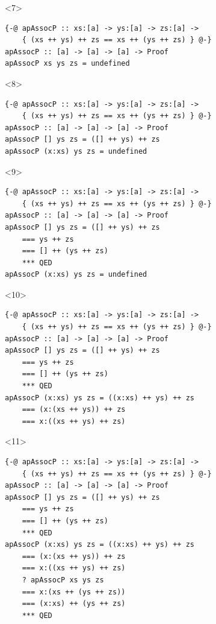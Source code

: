 \documentclass{beamer}
\begin{document}
\begin{frame}[fragile]
\begin{onlyenv}<7>
\begin{verbatim}
{-@ apAssocP :: xs:[a] -> ys:[a] -> zs:[a] ->
    { (xs ++ ys) ++ zs == xs ++ (ys ++ zs) } @-}
apAssocP :: [a] -> [a] -> [a] -> Proof
apAssocP xs ys zs = undefined
\end{verbatim}
\end{onlyenv}

\begin{onlyenv}<8>
\begin{verbatim}
{-@ apAssocP :: xs:[a] -> ys:[a] -> zs:[a] ->
    { (xs ++ ys) ++ zs == xs ++ (ys ++ zs) } @-}
apAssocP :: [a] -> [a] -> [a] -> Proof
apAssocP [] ys zs = ([] ++ ys) ++ zs
apAssocP (x:xs) ys zs = undefined
\end{verbatim}
\end{onlyenv}

\begin{onlyenv}<9>
\begin{verbatim}
{-@ apAssocP :: xs:[a] -> ys:[a] -> zs:[a] ->
    { (xs ++ ys) ++ zs == xs ++ (ys ++ zs) } @-}
apAssocP :: [a] -> [a] -> [a] -> Proof
apAssocP [] ys zs = ([] ++ ys) ++ zs
    === ys ++ zs
    === [] ++ (ys ++ zs)
    *** QED
apAssocP (x:xs) ys zs = undefined
\end{verbatim}
\end{onlyenv}

\begin{onlyenv}<10>
\begin{verbatim}
{-@ apAssocP :: xs:[a] -> ys:[a] -> zs:[a] ->
    { (xs ++ ys) ++ zs == xs ++ (ys ++ zs) } @-}
apAssocP :: [a] -> [a] -> [a] -> Proof
apAssocP [] ys zs = ([] ++ ys) ++ zs
    === ys ++ zs
    === [] ++ (ys ++ zs)
    *** QED
apAssocP (x:xs) ys zs = ((x:xs) ++ ys) ++ zs
    === (x:(xs ++ ys)) ++ zs
    === x:((xs ++ ys) ++ zs)
\end{verbatim}
\end{onlyenv}

\begin{onlyenv}<11>
\begin{verbatim}
{-@ apAssocP :: xs:[a] -> ys:[a] -> zs:[a] ->
    { (xs ++ ys) ++ zs == xs ++ (ys ++ zs) } @-}
apAssocP :: [a] -> [a] -> [a] -> Proof
apAssocP [] ys zs = ([] ++ ys) ++ zs
    === ys ++ zs
    === [] ++ (ys ++ zs)
    *** QED
apAssocP (x:xs) ys zs = ((x:xs) ++ ys) ++ zs
    === (x:(xs ++ ys)) ++ zs
    === x:((xs ++ ys) ++ zs)
    ? apAssocP xs ys zs
    === x:(xs ++ (ys ++ zs))
    === (x:xs) ++ (ys ++ zs)
    *** QED
\end{verbatim}
\end{onlyenv}


\end{frame}
\end{document}
